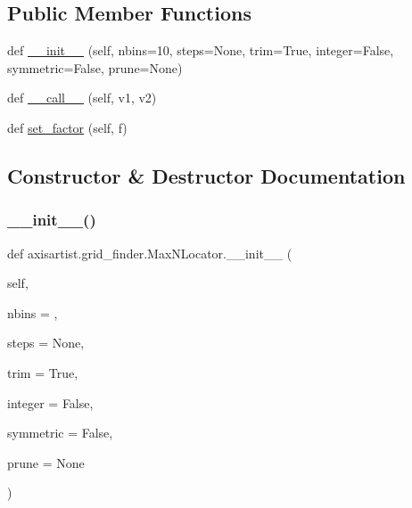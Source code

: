 \subsection*{Public Member Functions}
\begin{DoxyCompactItemize}
\item 
def \hyperlink{classaxisartist_1_1grid__finder_1_1MaxNLocator_acdc17db2de29a41da23389002034f41d}{\+\_\+\+\_\+init\+\_\+\+\_\+} (self, nbins=10, steps=None, trim=True, integer=False, symmetric=False, prune=None)
\item 
def \hyperlink{classaxisartist_1_1grid__finder_1_1MaxNLocator_af067580b3d3d0be74b7bf18089eb00b9}{\+\_\+\+\_\+call\+\_\+\+\_\+} (self, v1, v2)
\item 
def \hyperlink{classaxisartist_1_1grid__finder_1_1MaxNLocator_a811868c64afc5379f618a352b20624e8}{set\+\_\+factor} (self, f)
\end{DoxyCompactItemize}


\subsection{Constructor \& Destructor Documentation}
\mbox{\label{classaxisartist_1_1grid__finder_1_1MaxNLocator_acdc17db2de29a41da23389002034f41d}} 
\subsubsection{\texorpdfstring{\+\_\+\+\_\+init\+\_\+\+\_\+()}{\_\_init\_\_()}}
{\footnotesize\ttfamily def axisartist.\+grid\+\_\+finder.\+Max\+N\+Locator.\+\_\+\+\_\+init\+\_\+\+\_\+ (\begin{DoxyParamCaption}\item[{}]{self,  }\item[{}]{nbins = {},  }\item[{}]{steps = {\ttfamily None},  }\item[{}]{trim = {\ttfamily True},  }\item[{}]{integer = {\ttfamily False},  }\item[{}]{symmetric = {\ttfamily False},  }\item[{}]{prune = {\ttfamily None} }\end{DoxyParamCaption})}



